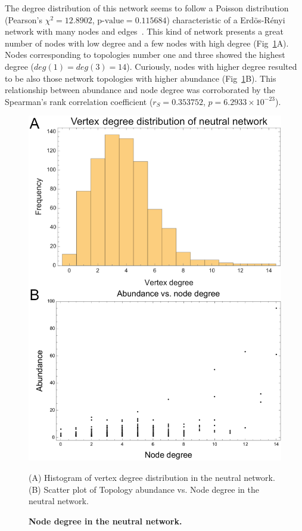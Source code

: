 \documentclass[10pt,letterpaper]{article}
\begin{document}
The degree distribution of this network seems to follow a Poisson distribution
(Pearson’s $\chi^2 = 12.8902$, $\text{p-value} = 0.115684$) characteristic of a
Erdös-Rényi network with many nodes and edges~\cite{Erdos1959}. This kind of
network presents a great
number of nodes with low degree and a few nodes with high degree
(Fig~\ref{fig:deg-dist}A). Nodes corresponding to topologies number one and
three showed the highest degree ($deg(1) = deg (3) = 14$). Curiously, nodes with
higher degree resulted to be also those network topologies with higher abundance
(Fig~\ref{fig:deg-dist}B). This relationship between abundance and node degree
was corroborated by the Spearman's rank correlation coefficient
($r_S = 0.353752$, $p = 6.2933\times10^{-23} $).

\begin{figure}[!h]
 \includegraphics[width=\textwidth]{figures/results/Fig4}
 \caption{\bf Node degree in the neutral network.}
 (A) Histogram of vertex degree distribution in the neutral network.
 (B) Scatter plot of Topology abundance vs. Node degree in the neutral
 network.
 \label{fig:deg-dist}
\end{figure}
\end{document}
